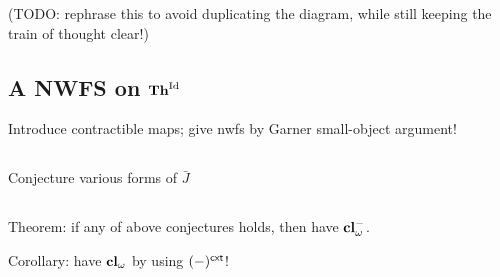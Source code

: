(TODO: rephrase this to avoid duplicating the diagram, while still keeping the train of thought clear!)

\subsection*{A NWFS on $\mathbf{Th}^{\mathrm{Id}}$} Introduce contractible maps; give nwfs by Garner small-object argument!

\subsection*{} Conjecture various forms of $\bar{J}$

\subsection*{} Theorem: if any of above conjectures holds, then have $\mathbf{cl}^-_\omega$.

\begin{para} Corollary: have $\mathbf{cl}_\omega$ by using $(-)^{\mathsf{cxt}}$!
\end{para}


